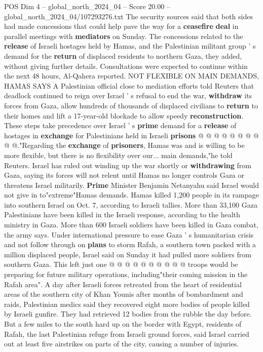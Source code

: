\begin{textsample}{POS Dim 4 – global\_north\_2024\_04 – Score 20.00 – global\_north\_2024\_04/107293276.txt}
The security sources said that both sides had made concessions that could help pave the way for a \textbf{ceasefire} \textbf{deal} in parallel meetings with \textbf{mediators} on Sunday.
The concessions related to the \textbf{release} of Israeli hostages held by Hamas, and the Palestinian militant group ' s demand for the \textbf{return} of displaced residents to northern Gaza, they added, without giving further details.
Consultations were expected to continue within the next 48 hours, Al-Qahera reported.
NOT FLEXIBLE ON MAIN DEMANDS, HAMAS SAYS A Palestinian official close to mediation efforts told Reuters that deadlock continued to reign over Israel ' s refusal to end the war, \textbf{withdraw} its forces from Gaza, allow hundreds of thousands of displaced civilians to \textbf{return} to their homes and lift a 17-year-old blockade to allow speedy \textbf{reconstruction}.
These steps take precedence over Israel ' s \textbf{prime} demand for a \textbf{release} of hostages in \textbf{exchange} for Palestinians held in Israeli \textbf{prisons} @ @ @ @ @ @ @ @ @ @."Regarding the \textbf{exchange} of \textbf{prisoners}, Hamas was and is willing to be more flexible, but there is no flexibility over our... main demands,"he told Reuters.
Israel has ruled out winding up the war shortly or \textbf{withdrawing} from Gaza, saying its forces will not relent until Hamas no longer controls Gaza or threatens Israel militarily. \textbf{Prime} Minister Benjamin Netanyahu said Israel would not give in to"extreme"Hamas demands.
Hamas killed 1,200 people in its rampage into southern Israel on Oct. 7, according to Israeli tallies.
More than 33,100 Gaza Palestinians have been killed in the Israeli response, according to the health ministry in Gaza.
More than 600 Israeli soldiers have been killed in Gaza combat, the army says.
Under international pressure to ease Gaza ' s humanitarian crisis and not follow through on \textbf{plans} to storm Rafah, a southern town packed with a million displaced people, Israel said on Sunday it had pulled more soldiers from southern Gaza.
This left just one @ @ @ @ @ @ @ @ @ @ troops would be preparing for future military operations, including"their coming mission in the Rafah area".
A day after Israeli forces retreated from the heart of residential areas of the southern city of Khan Younis after months of bombardment and raids, Palestinian medics said they recovered eight more bodies of people killed by Israeli gunfire.
They had retrieved 12 bodies from the rubble the day before.
But a few miles to the south hard up on the border with Egypt, residents of Rafah, the last Palestinian refuge from Israeli ground forces, said Israel carried out at least five airstrikes on parts of the city, causing a number of injuries.

\end{textsample}
